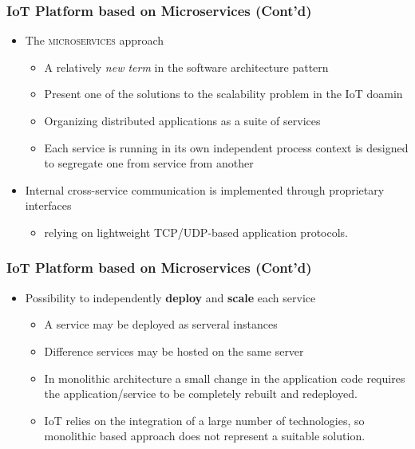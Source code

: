 \documentclass{../iot-lecture}
\begin{document}
\begin{frame}
  \frametitle{IoT Platform based on Microservices (Cont'd)}
  \begin{itemize}
    \item The \textsc{\color{YellowOrange} microservices} approach
    \begin{itemize}
      \item A relatively \textit{\color{LimeGreen} new term} in the software architecture pattern
      \item Present one of the solutions to the scalability problem in the IoT doamin
      \item Organizing distributed applications as a suite of services
      \item Each service is running in its own independent process context
        is designed to segregate one from service from another
    \end{itemize}
    \item Internal cross-service communication is implemented through proprietary interfaces
    \begin{itemize}
      \item relying on lightweight TCP/UDP-based application protocols.
    \end{itemize}
  \end{itemize}
\end{frame}

\begin{frame}
  \frametitle{IoT Platform based on Microservices (Cont'd)}
  \begin{itemize}
    \item Possibility to independently \textbf{\color{YellowOrange} deploy} and \textbf{\color{LimeGreen} scale} each service
    \begin{itemize}
      \item A service may be deployed as serveral instances
      \item Difference services may be hosted on the same server
      \item In monolithic architecture a small change in the application code requires the application/service
        to be completely rebuilt and redeployed.
      \item IoT relies on the integration of a large number of technologies, so monolithic based approach
        does not represent a suitable solution.
    \end{itemize}
  \end{itemize}
\end{frame}
\end{document}
